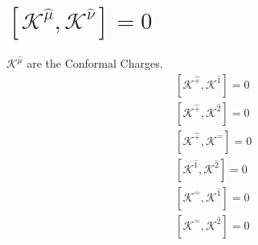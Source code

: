 \documentclass[]{article}
\numberwithin{equation}{section}
\begin{document}
\section{$\left[\mathcal{K}^{\hat{\mu}},\mathcal{K}^{\hat{\nu}}\right]=0$}
$\mathcal{K}^{\hat{\mu}}$ are the Conformal Charges.
\begin{align}
    &\left[\mathcal{K}^{\hat{+}},\mathcal{K}^{\hat{1}}\right]=0\\
    &\left[\mathcal{K}^{\hat{+}},\mathcal{K}^{\hat{2}}\right]=0\\
    &\left[\mathcal{K}^{\hat{+}},\mathcal{K}^{\hat{-}}\right]=0\\
    &\left[\mathcal{K}^{\hat{1}},\mathcal{K}^{\hat{2}}\right]=0\\
    & \left[\mathcal{K}^{\hat{-}},\mathcal{K}^{\hat{1}}\right]=0\\
    &\left[\mathcal{K}^{\hat{-}},\mathcal{K}^{\hat{2}}\right]=0
\end{align}
\end{document}
